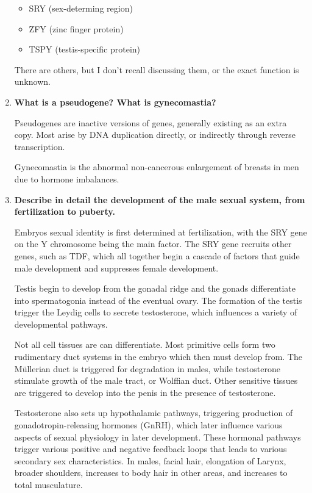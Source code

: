 \documentclass[basic]{inVerba-notes}
\begin{document}
\begin{enumerate}
    \begin{itemize}
      \item SRY (sex-determing region)
      \item ZFY (zinc finger protein)
      \item TSPY (testis-specific protein)
    \end{itemize}

    There are others, but I don't recall discussing them, or the exact function is unknown.


    \item \textbf{What is a pseudogene? What is gynecomastia?}
    
    Pseudogenes are inactive versions of genes, generally existing as an extra copy. Most arise by DNA duplication directly, or indirectly through reverse transcription.

    Gynecomastia is the abnormal non-cancerous enlargement of breasts in men due to hormone imbalances. 

    \item \textbf{Describe in detail the development of the male sexual system, from fertilization to puberty.}
    
    Embryos sexual identity is first determined at fertilization, with the SRY gene on the Y chromosome being the main factor. The SRY gene recruits other genes, such as TDF, which all together begin a cascade of factors that guide male development and suppresses female development.

    Testis begin to develop from the gonadal ridge and the gonads differentiate into spermatogonia instead of the eventual ovary. The formation of the testis trigger the Leydig cells to secrete testosterone, which influences a variety of developmental pathways.
    
    Not all cell tissues are can differentiate. Most primitive cells form two rudimentary duct systems in the embryo which then must develop from. The Müllerian duct is triggered for degradation in males, while testosterone stimulate growth of the male tract, or Wolffian duct. Other sensitive tissues are triggered to develop into the penis in the presence of testosterone.

    Testosterone also sets up hypothalamic pathways, triggering production of gonadotropin-releasing hormones (GnRH), which later influence various aspects of sexual physiology in later development. These hormonal pathways trigger various positive and negative feedback loops that leads to various secondary sex characteristics. In males, facial hair, elongation of Larynx, broader shoulders, increases to body hair in other areas, and increases to total musculature. 


\end{enumerate}
\end{document}
